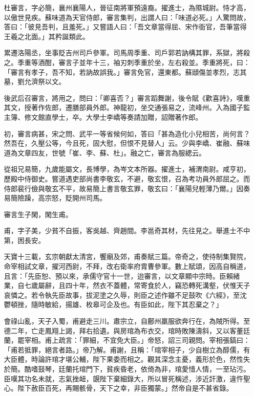 \begin{pinyinscope}
 杜審言，字必簡，襄州襄陽人，晉征南將軍預遠裔。擢進士，為隰城尉。恃才高，以傲世見疾。蘇味道為天官侍郎，審言集判，出謂人曰：「味道必死。」人驚問故，答曰：「彼見吾判，且羞死。」又嘗語人曰：「吾文章當得屈、宋作衙官，吾筆當得王羲之北面。」其矜誕類此。



 累遷洛陽丞，坐事貶吉州司戶參軍。司馬周季重、司戶郭若訥構其罪，系獄，將殺之。季重等酒酣，審言子並年十三，袖刃刺季重於坐，左右殺並。季重將死，曰：「審言有孝子，吾不知，若訥故誤我。」審言免官，還東都。蘇頲傷並孝烈，志其墓，劉允濟祭以文。



 後武后召審言，將用之，問曰：「卿喜否？」審言蹈舞謝，後令賦《歡喜詩》，嘆重其文，授著作佐郎，遷膳部員外郎。神龍初，坐交通張易之，流峰州。入為國子監主簿、修文館直學士，卒。大學士李嶠等奏請加贈，詔贈著作郎。



 初，審言病甚，宋之問、武平一等省候何如，答曰「甚為造化小兒相苦，尚何言？然吾在，久壓公等，今且死，固大慰，但恨不見替人」云。少與李嶠、崔融、蘇味道為文章四友，世號「崔、李、蘇、杜」。融之亡，審言為服緦云。



 從祖兄易簡，九歲能屬文，長博學，為岑文本所器。擢進士，補渭南尉。咸亨初，歷殿中侍御史。嘗道遇吏部尚書李敬玄，不避，敬玄恨，召為考功員外郎屈之。而侍郎裴行儉與敬玄不平，故易簡上書言敬玄罪，敬玄曰：「襄陽兒輕薄乃爾。」因奏易簡險躁，高宗怒，貶開州司馬。



 審言生子閑，閑生甫。



 甫，字子美，少貧不自振，客吳越、齊趙間。李邕奇其材，先往見之。舉進士不中第，困長安。



 天寶十三載，玄宗朝獻太清宮，饗廟及郊，甫奏賦三篇。帝奇之，使待制集賢院，命宰相試文章，擢河西尉，不拜，改右衛率府胄曹參軍。數上賦頌，因高自稱道，且言：「先臣恕、預以來，承儒守官十一世，迨審言，以文章顯中宗時。臣賴緒業，自七歲屬辭，且四十年，然衣不蓋體，常寄食於人，竊恐轉死溝壑，伏惟天子哀憐之。若令執先臣故事，拔泥塗之久辱，則臣之述作雖不足鼓吹《六經》，至沈鬱頓挫，隨時敏給，揚雄、枚皋可企及也。有臣如此，陛下其忍棄之？」



 會祿山亂，天子入蜀，甫避走三川。肅宗立，自鄜州羸服欲奔行在，為賊所得。至德二年，亡走鳳翔上謁，拜右拾遺。與房琯為布衣交，琯時敗陳濤斜，又以客董廷蘭，罷宰相。甫上疏言：「罪細，不宜免大臣。」帝怒，詔三司親問。宰相張鎬曰：「甫若抵罪，絕言者路。」帝乃解。甫謝，且稱：「琯宰相子，少自樹立為醇儒，有大臣體，時論許琯才堪公輔，陛下果委而相之。觀其深念主憂，義形於色，然性失於簡。酷嗜鼓琴，廷蘭托琯門下，貧疾昏老，依倚為非，琯愛惜人情，一至玷污。臣嘆其功名未就，志氣挫衄，覬陛下棄細錄大，所以冒死稱述，涉近訐激，違忤聖心。陛下赦臣百死，再賜骸骨，天下之幸，非臣獨蒙。」然帝自是不甚省錄。




\end{pinyinscope}
